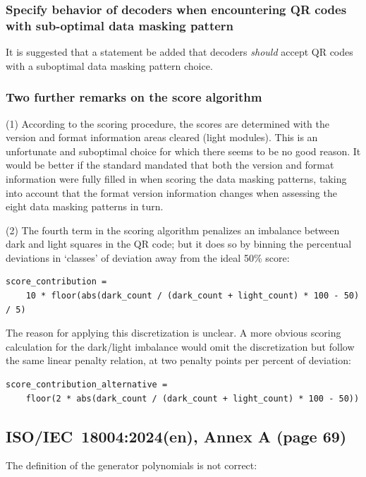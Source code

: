 \documentclass[a4paper,twoside]{article}
\newcommand{\shortstandard}{ISO/IEC~18004}
\newcommand{\standard}{\shortstandard:2024(en)}
\begin{document}
\subsubsection*{Specify behavior of decoders when encountering QR codes with sub-optimal data masking pattern}

It is suggested that a statement be added that decoders \emph{should} accept QR codes with a suboptimal data masking
pattern choice.

\subsubsection*{Two further remarks on the score algorithm}

(1) According to the scoring procedure, the scores are determined with the version and format information areas
cleared (light modules). This is an unfortunate and suboptimal choice for which there seems to be no good reason.
It would be better if the standard mandated that both the version and format information were fully filled in when 
scoring the data masking patterns, taking into account that the format version information changes when assessing
the eight data masking patterns in turn.

(2) The fourth term in the scoring algorithm penalizes an imbalance between dark and light
squares in the QR code; but it does so by binning the percentual deviations in `classes' of
deviation away from the ideal 50\% score:

\begin{verbatim}
score_contribution =
    10 * floor(abs(dark_count / (dark_count + light_count) * 100 - 50) / 5)
\end{verbatim}

The reason for applying this discretization is unclear. A more obvious scoring calculation for the
dark/light imbalance would omit the discretization but follow the same linear penalty relation,
at two penalty points per percent of deviation:

\begin{verbatim}
score_contribution_alternative =
    floor(2 * abs(dark_count / (dark_count + light_count) * 100 - 50))
\end{verbatim}

\subsection{\standard, Annex A (page 69)}

The definition of the generator polynomials is not correct:
\end{document}
